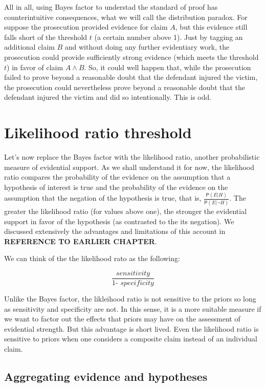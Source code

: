 \documentclass[10pt,dvipsnames,enabledeprecatedfontcommands]{scrartcl}
\newcommand{\pr}[1]{\mathsf{P}(#1)}
\begin{document}
All in all, using Bayes factor to understad the standard of proof has
counterintuitive consequences, what we will call the distribution
paradox. For suppose the prosecution provided evidence for claim \(A\),
but this evidence still falls short of the threshold \(t\) (a certain
number above 1). Just by tagging an additional claim \(B\) and without
doing any further evidentiary work, the prosecution could provide
sufficiently strong evidence (which meets the threshold \(t\)) in favor
of claim \(A \wedge B\). So, it could well happen that, while the
prosecution failed to prove beyond a reasonable doubt that the defendant
injured the victim, the prosecution could nevertheless prove beyond a
reasonable doubt that the defendant injured the victim and did so
intentionally. This is odd.

\hypertarget{likelihood-ratio-threshold}{%
\section{Likelihood ratio threshold}\label{likelihood-ratio-threshold}}

Let's now replace the Bayes factor with the likelihood ratio, another
probabilistic measure of evidential support. As we shall understand it
for now, the likelihood ratio compares the probability of the evidence
on the assumption that a hypothesis of interest is true and the
probability of the evidence on the assumption that the negation of the
hypothesis is true, that is,
\(\frac{\pr{E \vert H}}{\pr{E \vert \neg H}}\). The greater the
likelihood ratio (for values above one), the stronger the evidential
support in favor of the hypothesis (as contrasted to the its negation).
We discussed extensively the advantages and limitations of this account
in \textbf{REFERENCE TO EARLIER CHAPTER}.

We can think of the the likelihood rato as the following:

\[\frac{\textit{sensitivity}}{\textit{1- specificity}}\]

\noindent Unlike the Bayes factor, the likleihood ratio is not sensitive
to the priors so long as sensitivity and specificity are not. In this
sense, it is a more suitable measure if we want to factor out the
effects that priors may have on the assessment of evidential strength.
But this advantage is short lived. Even the likelihood ratio is
sensitive to priors when one considers a composite claim instead of an
individual claim.

\hypertarget{aggregating-evidence-and-hypotheses}{%
\subsection{Aggregating evidence and
hypotheses}\label{aggregating-evidence-and-hypotheses}}
\end{document}
